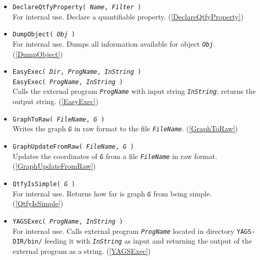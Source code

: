 \documentclass[a4paper,11pt]{report}
\begin{document}
{{\begin{itemize}
\item \texttt{DeclareQtfyProperty( \mbox{\texttt{\mdseries\slshape Name}}, \mbox{\texttt{\mdseries\slshape Filter}} )}\\
 For internal use. Declare a quantifiable property. (\ref{DeclareQtfyProperty}) 
\item \texttt{DumpObject( \mbox{\texttt{\mdseries\slshape Obj}} )}\\
 For internal use. Dumps all information available for object \mbox{\texttt{\mdseries\slshape Obj}}. (\ref{DumpObject}) 
\item \texttt{EasyExec( \mbox{\texttt{\mdseries\slshape Dir}}, \mbox{\texttt{\mdseries\slshape ProgName}}, \mbox{\texttt{\mdseries\slshape InString}} )}\\
 \texttt{EasyExec( \mbox{\texttt{\mdseries\slshape ProgName}}, \mbox{\texttt{\mdseries\slshape InString}} )}\\
 Calls the external program \mbox{\texttt{\mdseries\slshape ProgName}} with input string \mbox{\texttt{\mdseries\slshape InString}}; returns the output string. (\ref{EasyExec}) 
\item \texttt{GraphToRaw( \mbox{\texttt{\mdseries\slshape FileName}}, \mbox{\texttt{\mdseries\slshape G}} )}\\
 Writes the graph \mbox{\texttt{\mdseries\slshape G}} in raw format to the file \mbox{\texttt{\mdseries\slshape FileName}}. (\ref{GraphToRaw}) 
\item \texttt{GraphUpdateFromRaw( \mbox{\texttt{\mdseries\slshape FileName}}, \mbox{\texttt{\mdseries\slshape G}} )}\\
 Updates the coordinates of \mbox{\texttt{\mdseries\slshape G}} from a file \mbox{\texttt{\mdseries\slshape FileName}} in raw format. (\ref{GraphUpdateFromRaw}) 
\item \texttt{QtfyIsSimple( \mbox{\texttt{\mdseries\slshape G}} )}\\
 For internal use. Returns how far is graph \mbox{\texttt{\mdseries\slshape G}} from being simple. (\ref{QtfyIsSimple}) 
\item \texttt{YAGSExec( \mbox{\texttt{\mdseries\slshape ProgName}}, \mbox{\texttt{\mdseries\slshape InString}} )}\\
 For internal use. Calls external program \mbox{\texttt{\mdseries\slshape ProgName}} located in directory \texttt{YAGS-DIR/bin/} feeding it with \mbox{\texttt{\mdseries\slshape InString}} as input and returning the output of the external program as a string. (\ref{YAGSExec}) 
\end{itemize}
 }

 }
\end{document}
